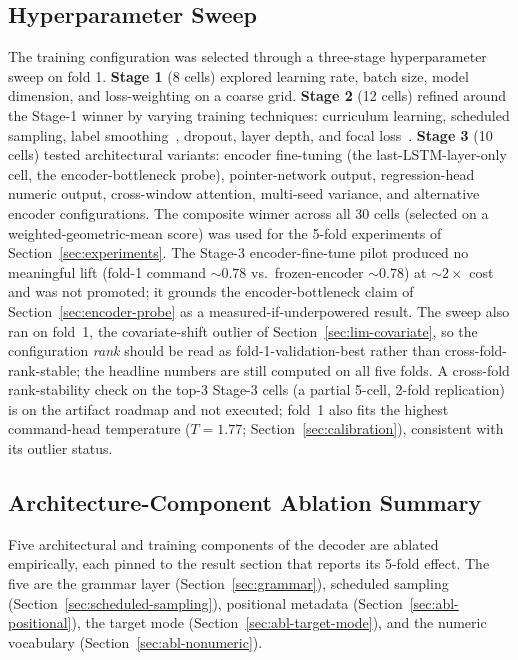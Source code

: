 \documentclass[sensors,article,submit,moreauthors,pdftex]{Definitions/mdpi}
\begin{document}
\subsection{Hyperparameter Sweep}
\label{sec:hp-sweep}

The training configuration was selected through a three-stage hyperparameter sweep on fold 1.
\textbf{Stage 1} (8 cells) explored learning rate, batch size, model dimension, and loss-weighting on a coarse grid.
\textbf{Stage 2} (12 cells) refined around the Stage-1 winner by varying training techniques: curriculum learning, scheduled sampling, label smoothing~\cite{szegedy2016inception}, dropout, layer depth, and focal loss~\cite{focal_loss}.
\textbf{Stage 3} (10 cells) tested architectural variants: encoder fine-tuning (the last-LSTM-layer-only cell, the encoder-bottleneck probe), pointer-network output, regression-head numeric output, cross-window attention, multi-seed variance, and alternative encoder configurations. The composite winner across all 30 cells (selected on a weighted-geometric-mean score) was used for the 5-fold experiments of Section~\ref{sec:experiments}. The Stage-3 encoder-fine-tune pilot produced no meaningful lift (fold-1 command $\sim\!0.78$ vs.\ frozen-encoder $\sim\!0.78$) at $\sim\!2\times$ cost and was not promoted; it grounds the encoder-bottleneck claim of Section~\ref{sec:encoder-probe} as a measured-if-underpowered result. The sweep also ran on fold~1, the covariate-shift outlier of Section~\ref{sec:lim-covariate}, so the configuration \emph{rank} should be read as fold-1-validation-best rather than cross-fold-rank-stable; the headline numbers are still computed on all five folds. A cross-fold rank-stability check on the top-3 Stage-3 cells (a partial 5-cell, 2-fold replication) is on the artifact roadmap and not executed; fold~1 also fits the highest command-head temperature ($T\!=\!1.77$; Section~\ref{sec:calibration}), consistent with its outlier status.

\subsection{Architecture-Component Ablation Summary}
\label{sec:arch-ablation-summary}

Five architectural and training components of the decoder are ablated empirically, each pinned to the result section that reports its 5-fold effect. The five are the grammar layer (Section~\ref{sec:grammar}), scheduled sampling (Section~\ref{sec:scheduled-sampling}), positional metadata (Section~\ref{sec:abl-positional}), the target mode (Section~\ref{sec:abl-target-mode}), and the numeric vocabulary (Section~\ref{sec:abl-nonumeric}).
\end{document}

